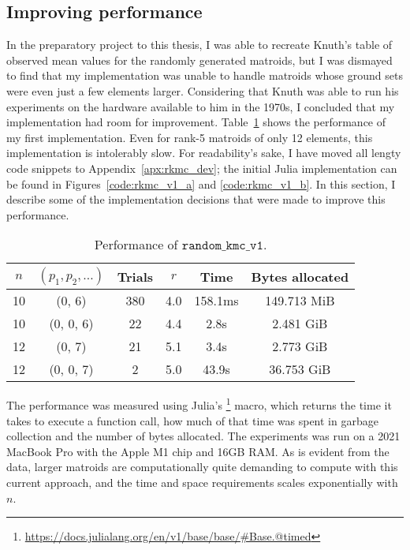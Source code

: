 \subsection{Improving performance}
\label{sec:improving-performance}
In the preparatory project to this thesis, I was able to recreate Knuth's table of observed mean values for the randomly generated matroids, but I was dismayed to find that my implementation was unable to handle matroids whose ground sets were even just a few elements larger. Considering that Knuth was able to run his experiments on the hardware available to him in the 1970s, I concluded that my implementation had room for improvement. Table~\ref{tab:perf_v1} shows the performance of my first implementation. Even for rank-5 matroids of only 12 elements, this implementation is intolerably slow. For readability's sake, I have moved all lengty code snippets to Appendix~\ref{apx:rkmc_dev}; the initial Julia implementation can be found in Figures~\ref{code:rkmc_v1_a} and \ref{code:rkmc_v1_b}. In this section, I describe some of the implementation decisions that were made to improve this performance.

\begin{table}
  \centering
    \begin{tabular}{cccccc}
      \toprule
      $n$ & $(p_1, p_2, \ldots)$ & Trials & $r$ & Time & Bytes allocated \\
      \midrule
      10 & (0, 6)     & 380  & 4.0  & 158.1ms & 149.713 MiB   \\
      10 & (0, 0, 6)  & 22   & 4.4  & 2.8s    & 2.481 GiB     \\
      12 & (0, 7)     & 21   & 5.1  & 3.4s    & 2.773 GiB     \\
      12 & (0, 0, 7)  & 2    & 5.0  & 43.9s   & 36.753 GiB    \\
      \bottomrule
    \end{tabular}
  \caption{Performance of $\texttt{random\_kmc\_v1}$.}
  \label{tab:perf_v1}
\end{table}

The performance was measured using Julia's \footnote{\href{https://docs.julialang.org/en/v1/base/base/\#Base.@timed}{https://docs.julialang.org/en/v1/base/base/\#Base.@timed}} macro, which returns the time it takes to execute a function call, how much of that time was spent in garbage collection and the number of bytes allocated. The experiments was run on a 2021 MacBook Pro with the Apple M1 chip and 16GB RAM. As is evident from the data, larger matroids are computationally quite demanding to compute with this current approach, and the time and space requirements scales exponentially with $n$.

